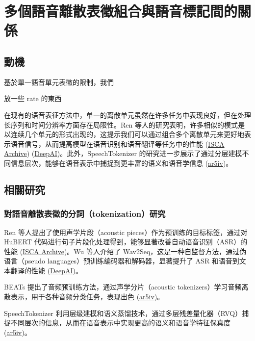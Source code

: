\chapter{多個語音離散表徵組合與語音標記間的關係}

\section{動機}

基於單一語音單元表徵的限制，我們

放一些 rate 的東西


在现有的语音表征方法中，单一的离散单元虽然在许多任务中表现良好，但在处理长序列和时间分辨率方面存在局限性。Ren 等人的研究表明，许多相似的模式是以连续几个单元的形式出现的，这提示我们可以通过组合多个离散单元来更好地表示语音信号，从而提高模型在语音识别和语音翻译等任务中的性能 (\href{https://www.isca-archive.org/interspeech_2022/ren22_interspeech.html}{ISCA Archive}) (\href{https://deepai.org/publication/speech-pre-training-with-acoustic-piece}{DeepAI})。此外，SpeechTokenizer 的研究进一步展示了通过分层建模不同信息层次，能够在语音表示中捕捉到更丰富的语义和语音学信息 (\href{https://ar5iv.org/pdf/2308.16692}{ar5iv})。 


\section{相關研究}

\subsection{對語音離散表徵的分詞（tokenization）研究}

Ren 等人提出了使用声学片段（acoustic pieces）作为预训练的目标标签，通过对 HuBERT 代码进行句子片段化处理得到，能够显著改善自动语音识别（ASR）的性能 (\href{https://www.isca-archive.org/interspeech_2022/ren22_interspeech.html}{ISCA Archive})。Wu 等人介绍了 Wav2Seq，这是一种自监督方法，通过伪语言（pseudo languages）预训练编码器和解码器，显著提升了 ASR 和语音到文本翻译的性能 (\href{https://deepai.org/publication/speech-pre-training-with-acoustic-piece}{DeepAI})。

BEATs 提出了音频预训练方法，通过声学分片（acoustic tokenizers）学习音频离散表示，用于各种音频分类任务，表现出色 (\href{https://ar5iv.org/abs/2212.09058}{ar5iv})。

SpeechTokenizer 利用层级建模和语义蒸馏技术，通过多层残差量化器（RVQ）捕捉不同层次的信息，从而在语音表示中实现更高的语义和语音学特征保真度 (\href{https://ar5iv.org/pdf/2308.16692}{ar5iv})。





